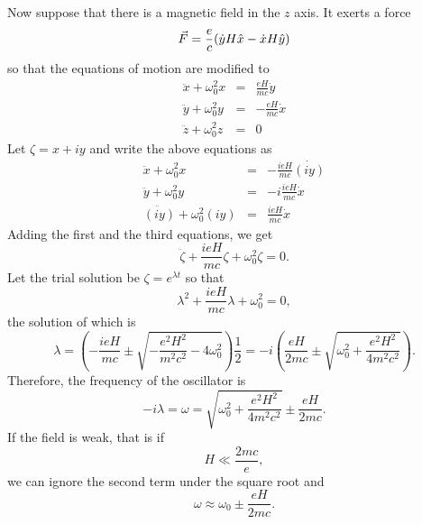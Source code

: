 \begin{enumerate}
Now suppose that there is a magnetic field in the $z$ axis. It exerts a force
\[
\vec{F} = \frac{e}{c}(\dot{y} H\hat{x} - \dot{x}H\hat{y})
\]
so that the equations of motion are modified to
\begin{eqnarray*}
\ddot{x} + \omega_0^2 x &=& \frac{eH}{mc}\dot{y} \\
\ddot{y} + \omega_0^2 y &=& -\frac{eH}{mc}\dot{x}\\
\ddot{z} + \omega_0^2 z &=& 0
\end{eqnarray*}
Let $\zeta = x + iy$ and write the above equations as
\begin{eqnarray*}
\ddot{x} + \omega_0^2 x &=& -\frac{ieH}{mc}\dot{(iy)} \\
\ddot{y} + \omega_0^2 y &=& -i\frac{ieH}{mc}\dot{x} \\
\ddot{(iy)} + \omega_0^2 (iy) &=& \frac{ieH}{mc}\dot{x}
\end{eqnarray*}
Adding the first and the third equations, we get
\[
\ddot{\zeta} + \frac{ieH}{mc}\zeta + \omega_0^2\zeta = 0.
\]
Let the trial solution be $\zeta = e^{\lambda t}$ so that 
\[
\lambda^2 + \frac{ieH}{mc}\lambda + \omega_0^2 = 0,
\]
the solution of which is
\[
\lambda = 
\left(-\frac{ieH}{mc} \pm \sqrt{-\frac{e^2H^2}{m^2c^2} - 4\omega_0^2}\right)
\frac{1}{2} = -i\left(\frac{eH}{2mc} \pm 
\sqrt{\omega_0^2 + \frac{e^2H^2}{4m^2c^2}}\right).
\]
Therefore, the frequency of the oscillator is
\[
-i\lambda = \omega = \sqrt{\omega_0^2 + \frac{e^2H^2}{4m^2c^2}} \pm 
\frac{eH}{2mc}.
\]
If the field is weak, that is if
\[
H \ll \frac{2mc}{e},
\]
we can ignore the second term under the square root and
\[
\omega \approx \omega_0 \pm \frac{eH}{2mc}.
\]


\end{enumerate}

